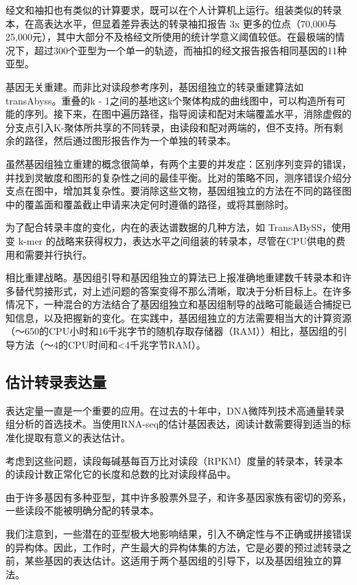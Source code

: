经文和袖扣也有类似的计算要求，既可以在个人计算机上运行。组装类似的转录本，在高表达水平，但显着差异表达的转录袖扣报告 3x 更多的位点（70,000与25,000元），其中大部分不及格经文所使用的统计学意义阈值较低。在最极端的情况下，超过300个亚型为一个单一的轨迹，而袖扣的经文报告报告相同基因的11种亚型。

基因无关重建。而非比对读段参考序列，基因组独立的转录重建算法如transAbyss。重叠的k  -  1之间的基地这k个聚体构成的曲线图中，可以构造所有可能的序列。接下来，在图中遍历路径，指导阅读和配对末端覆盖水平，消除虚假的分支点引入K-聚体所共享的不同转录，由读段和配对两端的，但不支持。所有剩余的路径，然后通过图形报告​​作为一个单独的转录本。

虽然基因组独立重建的概念很简单，有两个主要的并发症：区别序列变异的错误，并找到灵敏度和图形的复杂性之间的最佳平衡。比对的策略不同，测序错误介绍分支点在图中，增加其复杂性。要消除这些文物，基因组独立的方法在不同的路径图中的覆盖面和覆盖截止申请来决定何时遵循的路径，或将其删除时。

为了配合转录丰度的变化，内在的表达谱数据的几种方法，如 TransABySS，使用变 k-mer 的战略来获得权力，表达水平之间组装的转录本，尽管在CPU供电的费用和需要并行执行。

相比重建战略。基因组引导和基因组独立的算法已上报准确地重建数千转录本和许多替代剪接形式，对上述问题的答案变得不那么清晰，取决于分析目标上。在许多情况下，一种混合​​的方法结合了基因组独立和基因组制导的战略可能最适合捕捉已知信息，以及把握新的变化。在实践中，基因组独立的方法需要相当大的计算资源（〜650的CPU小时和16千兆字节的随机存取存储器（RAM））相比，基因组的引导方法（〜4的CPU时间和<4千兆字节RAM）。

\subsection{估计转录表达量}

表达定量一直是一个重要的应用。在过去的十年中，DNA微阵列技术高通量转录组分析的首选技术。当使用RNA-seq的估计基因表达，阅读计数需要得到适当的标准化提取有意义的表达估计。

考虑到这些问题，读段每碱基每百万比对读段（RPKM）度量的转录本，转录本的读段计数正常化它的长度和总数的比对读段样品中。

由于许多基因有多种亚型，其中许多股票外显子，和许多基因家族有密切的旁系，一些读段不能被明确分配的转录本。

我们注意到，一些潜在的亚型极大地影响结果，引入不确定性与不正确或拼接错误的异构体。因此，工作时，产生最大的异构体集的方法，它是必要的预过滤转录之前，某些基因的表达估计。这适用于两个基因组的引导下，以及基因组独立的算法。

